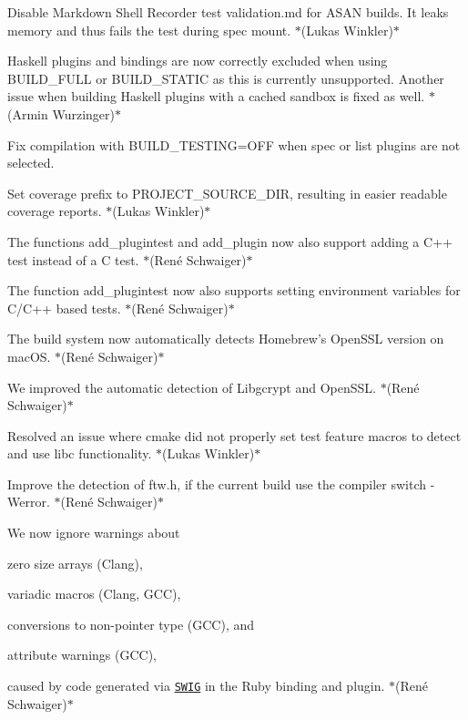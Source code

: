 \begin{DoxyItemize}
\item Disable Markdown Shell Recorder test {\ttfamily validation.\+md} for A\+S\+AN builds. It leaks memory and thus fails the test during spec mount. $\ast$(Lukas Winkler)$\ast$
\item Haskell plugins and bindings are now correctly excluded when using {\ttfamily B\+U\+I\+L\+D\+\_\+\+F\+U\+LL} or {\ttfamily B\+U\+I\+L\+D\+\_\+\+S\+T\+A\+T\+IC} as this is currently unsupported. Another issue when building Haskell plugins with a cached sandbox is fixed as well. $\ast$(Armin Wurzinger)$\ast$
\item Fix compilation with {\ttfamily B\+U\+I\+L\+D\+\_\+\+T\+E\+S\+T\+I\+NG=O\+FF} when {\ttfamily spec} or {\ttfamily list} plugins are not selected.
\item Set coverage prefix to {\ttfamily P\+R\+O\+J\+E\+C\+T\+\_\+\+S\+O\+U\+R\+C\+E\+\_\+\+D\+IR}, resulting in easier readable coverage reports. $\ast$(Lukas Winkler)$\ast$
\item The functions {\ttfamily add\+\_\+plugintest} and {\ttfamily add\+\_\+plugin} now also support adding a C++ test instead of a C test. $\ast$(René Schwaiger)$\ast$
\item The function {\ttfamily add\+\_\+plugintest} now also supports setting environment variables for C/\+C++ based tests. $\ast$(René Schwaiger)$\ast$
\item The build system now automatically detects Homebrew’s Open\+S\+SL version on mac\+OS. $\ast$(René Schwaiger)$\ast$
\item We improved the automatic detection of Libgcrypt and Open\+S\+SL. $\ast$(René Schwaiger)$\ast$
\item Resolved an issue where cmake did not properly set test feature macros to detect and use libc functionality. $\ast$(Lukas Winkler)$\ast$
\item Improve the detection of {\ttfamily ftw.\+h}, if the current build use the compiler switch {\ttfamily -\/\+Werror}. $\ast$(René Schwaiger)$\ast$
\item We now ignore warnings about
\begin{DoxyItemize}
\item zero size arrays (Clang),
\item variadic macros (Clang, G\+CC),
\item conversions to non-\/pointer type (G\+CC), and
\item attribute warnings (G\+CC),
\end{DoxyItemize}

caused by code generated via \href{http://www.swig.org}{\tt S\+W\+IG} in the Ruby binding and plugin. $\ast$(René Schwaiger)$\ast$
\end{DoxyItemize}

